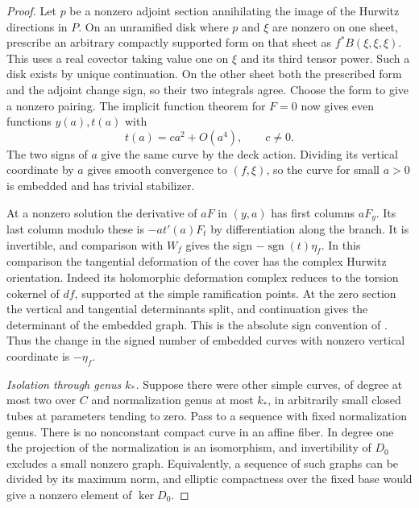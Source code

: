 \begin{proof}
Let $p$ be a nonzero adjoint section annihilating the image of the
Hurwitz directions in $P$. On an unramified disk where $p$ and $\xi$
are nonzero on one sheet, prescribe an arbitrary compactly supported
form on that sheet as $f^*B(\xi,\xi,\xi)$. This uses a real covector
taking value one on $\xi$ and its third tensor power. Such a disk
exists by unique continuation. On the other sheet both the prescribed
form and the adjoint change sign, so their two integrals agree.
Choose the form to give a nonzero pairing. The implicit function
theorem for $F=0$ now gives even functions $y(a),t(a)$ with
\[
                     t(a)=c a^2+O(a^4),\qquad c\ne0 .
\]
The two signs of $a$ give the same curve by the deck action. Dividing
its vertical coordinate by $a$ gives smooth convergence to
$(f,\xi)$, so the curve for small $a>0$ is embedded and has trivial
stabilizer.

At a nonzero solution the derivative of $aF$ in $(y,a)$ has first
columns $aF_y$. Its last column modulo these is $-a t'(a)F_t$ by
differentiation along the branch. It is invertible, and comparison
with $W_f$ gives the sign $-\operatorname{sgn}(t)\eta_f$. In this
comparison the tangential deformation of the cover has the complex
Hurwitz orientation. Indeed its holomorphic deformation complex reduces
to the torsion cokernel of $df$, supported at the simple ramification
points. At the zero section the vertical and tangential determinants
split, and continuation gives the determinant of the embedded graph.
This is the absolute sign convention of
\cite[Theorem~4.12 and (4.30), (4.59)]{bai}. Thus the change in the
signed number of embedded curves with nonzero vertical coordinate is
$-\eta_f$.

\smallskip
\noindent\emph{Isolation through genus $k_*$.}
Suppose there were other simple curves, of degree at most two over $C$
and normalization genus at most $k_*$, in arbitrarily small closed
tubes at parameters tending to zero. Pass to a sequence with fixed
normalization genus. There is no nonconstant compact curve in an
affine fiber. In degree one the projection of the normalization is an
isomorphism, and invertibility of $D_0$ excludes a small nonzero graph.
Equivalently, a sequence of such graphs can be divided by its maximum
norm, and elliptic compactness over the fixed base would give a
nonzero element of $\ker D_0$.


\end{proof}
